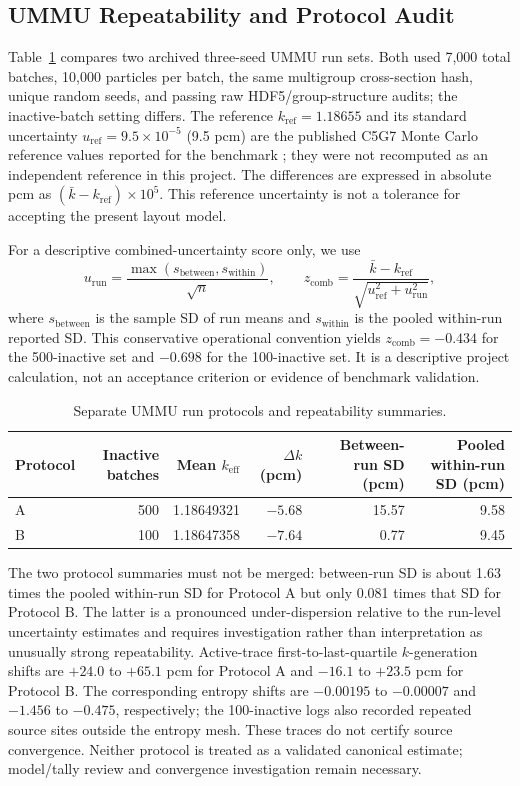 \documentclass[conference]{IEEEtran}
\begin{document}
\subsection{UMMU Repeatability and Protocol Audit}
Table~\ref{tab:ummu} compares two archived three-seed UMMU run sets. Both used 7,000 total batches, 10,000 particles per batch, the same multigroup cross-section hash, unique random seeds, and passing raw HDF5/group-structure audits; the inactive-batch setting differs. The reference $k_{\mathrm{ref}}=1.18655$ and its standard uncertainty $u_{\mathrm{ref}}=9.5\times10^{-5}$ (9.5 pcm) are the published C5G7 Monte Carlo reference values reported for the benchmark \cite{nea2003,song2020}; they were not recomputed as an independent reference in this project. The differences are expressed in absolute pcm as $(\bar{k}-k_{\mathrm{ref}})\times10^5$. This reference uncertainty is not a tolerance for accepting the present layout model.

For a descriptive combined-uncertainty score only, we use
\[
u_{\mathrm{run}}=\frac{\max(s_{\mathrm{between}},s_{\mathrm{within}})}{\sqrt{n}},\qquad
z_{\mathrm{comb}}=\frac{\bar{k}-k_{\mathrm{ref}}}
{\sqrt{u_{\mathrm{ref}}^2+u_{\mathrm{run}}^2}},
\]
where $s_{\mathrm{between}}$ is the sample SD of run means and $s_{\mathrm{within}}$ is the pooled within-run reported SD. This conservative operational convention yields $z_{\mathrm{comb}}=-0.434$ for the 500-inactive set and $-0.698$ for the 100-inactive set. It is a descriptive project calculation, not an acceptance criterion or evidence of benchmark validation.

\begin{table}[t]
\caption{Separate UMMU run protocols and repeatability summaries.}
\label{tab:ummu}
\centering
\small
\setlength{\tabcolsep}{5pt}
\begin{tabular}{l r r r r r}
\toprule
Protocol & Inactive batches & Mean $k_{\mathrm{eff}}$ & $\Delta k$ (pcm) & Between-run SD (pcm) & Pooled within-run SD (pcm)\\
\midrule
A & 500 & 1.18649321 & $-5.68$ & 15.57 & 9.58\\
B & 100 & 1.18647358 & $-7.64$ & 0.77 & 9.45\\
\bottomrule
\end{tabular}
\end{table}

The two protocol summaries must not be merged: between-run SD is about 1.63 times the pooled within-run SD for Protocol A but only 0.081 times that SD for Protocol B. The latter is a pronounced under-dispersion relative to the run-level uncertainty estimates and requires investigation rather than interpretation as unusually strong repeatability. Active-trace first-to-last-quartile $k$-generation shifts are $+24.0$ to $+65.1$ pcm for Protocol A and $-16.1$ to $+23.5$ pcm for Protocol B. The corresponding entropy shifts are $-0.00195$ to $-0.00007$ and $-1.456$ to $-0.475$, respectively; the 100-inactive logs also recorded repeated source sites outside the entropy mesh. These traces do not certify source convergence. Neither protocol is treated as a validated canonical estimate; model/tally review and convergence investigation remain necessary.
\end{document}
